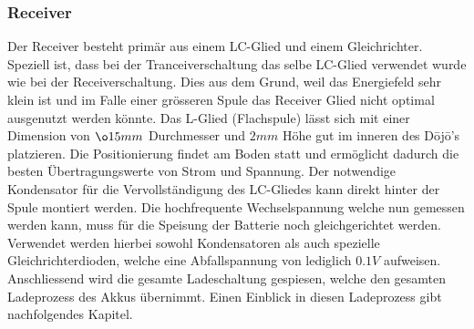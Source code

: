\subsubsection*{Receiver}
Der Receiver besteht primär aus einem LC-Glied und einem Gleichrichter. Speziell ist, dass bei der Tranceiverschaltung das selbe LC-Glied verwendet wurde wie bei der Receiverschaltung. Dies aus dem Grund, weil das Energiefeld sehr klein ist und im Falle einer grösseren Spule das Receiver Glied nicht optimal ausgenutzt werden könnte. Das L-Glied (Flachspule) lässt sich mit einer Dimension von $\o 15mm$ Durchmesser und $2mm$ Höhe gut im inneren des Dōjō’s platzieren. Die Positionierung findet am Boden statt und ermöglicht dadurch die besten Übertragungswerte von Strom und Spannung. Der notwendige Kondensator für die Vervollständigung des LC-Gliedes kann direkt hinter der Spule montiert werden. Die hochfrequente Wechselspannung welche nun gemessen werden kann, muss für die Speisung der Batterie noch gleichgerichtet werden. Verwendet werden hierbei sowohl Kondensatoren als auch spezielle Gleichrichterdioden, welche eine Abfallspannung von lediglich $0.1V$ aufweisen. Anschliessend wird die gesamte Ladeschaltung gespiesen, welche den gesamten Ladeprozess des Akkus übernimmt. Einen Einblick in diesen Ladeprozess gibt nachfolgendes Kapitel.
